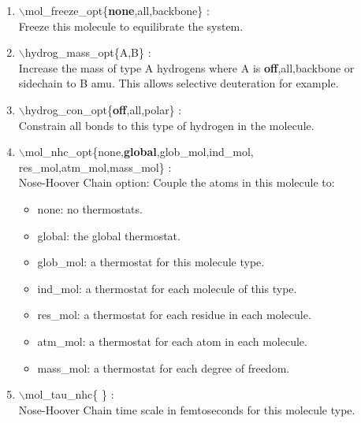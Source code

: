 \documentclass[12pt]{article}
\begin{document}
\begin{itemize}
\begin{enumerate}
 \vspace{0.15in} \Large
 \item  $\backslash$mol\_freeze\_opt\{{\bf none},all,backbone\} : \\
    \large
    Freeze this molecule to equilibrate the system.

 \vspace{0.15in} \Large
 \item  $\backslash$hydrog\_mass\_opt\{A,B\} : \\
    \large
   Increase the mass of type A hydrogens where A is 
   {\bf off},all,backbone or sidechain to B amu. This allows
   selective deuteration for example.

 \vspace{0.15in} \Large
 \item  $\backslash$hydrog\_con\_opt\{{\bf off},all,polar\} : \\
    \large
   Constrain all bonds to this type of hydrogen in the molecule.

 \vspace{0.15in} \Large
 \item  $\backslash$mol\_nhc\_opt\{none,{\bf global},glob\_mol,ind\_mol,\\ 
                 \hspace*{0.5in}res\_mol,atm\_mol,mass\_mol\} :  \\
    \large
   Nose-Hoover Chain option: Couple the atoms in this molecule to:
      \begin{itemize}
         \item none:     no thermostats.
         \item global:   the global thermostat.
         \item glob\_mol: a thermostat for this molecule type. 
         \item ind\_mol:  a thermostat for each molecule of this type. 
         \item res\_mol:  a thermostat for each residue in each molecule.
         \item atm\_mol:  a thermostat for each atom in each molecule.
         \item mass\_mol: a thermostat for each degree of freedom.
      \end{itemize}

 \vspace{0.15in} \Large
 \item  $\backslash$mol\_tau\_nhc\{ \} : \\
    \large
   Nose-Hoover Chain time scale in femtoseconds for this molecule type.


\end{enumerate}
\end{itemize}
\end{document}
